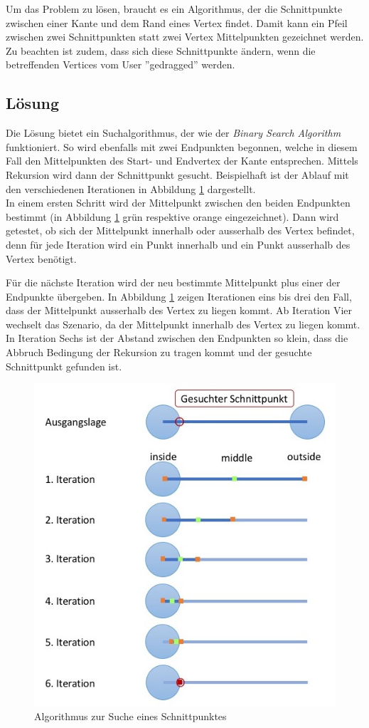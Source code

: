 \documentclass[11pt,a4paper,english,oneside]{book}
\numberwithin{equation}{chapter}
\begin{document}
	Um das Problem zu lösen, braucht es ein Algorithmus, der die Schnittpunkte zwischen einer Kante und dem Rand eines Vertex findet. Damit kann ein Pfeil zwischen zwei Schnittpunkten statt zwei Vertex Mittelpunkten gezeichnet werden. Zu beachten ist zudem, dass sich diese Schnittpunkte ändern, wenn die betreffenden Vertices vom User ''gedragged'' werden.
	
	\subsection{Lösung}
	Die Lösung bietet ein Suchalgorithmus, der wie der \textit{Binary Search Algorithm} \cite{adbook} funktioniert. So wird ebenfalls mit zwei Endpunkten begonnen, welche in diesem Fall den Mittelpunkten des Start- und Endvertex der Kante entsprechen. Mittels Rekursion wird dann der Schnittpunkt gesucht. Beispielhaft ist der Ablauf mit den verschiedenen Iterationen in Abbildung \ref{fig:binarySearch} dargestellt. \\
	In einem ersten Schritt wird der Mittelpunkt zwischen den beiden Endpunkten bestimmt (in Abbildung  \ref{fig:binarySearch} grün respektive orange eingezeichnet). Dann wird getestet, ob sich der Mittelpunkt innerhalb oder ausserhalb des Vertex befindet, denn für jede Iteration wird ein Punkt innerhalb und ein Punkt ausserhalb des Vertex benötigt.
	
	Für die nächste Iteration wird der neu bestimmte Mittelpunkt plus einer der Endpunkte übergeben. In Abbildung  \ref{fig:binarySearch} zeigen Iterationen eins bis drei den Fall, dass der Mittelpunkt ausserhalb des Vertex zu liegen kommt. Ab Iteration Vier wechselt das Szenario, da der Mittelpunkt innerhalb des Vertex zu liegen kommt. In Iteration Sechs ist der Abstand zwischen den Endpunkten so klein, dass die Abbruch Bedingung der Rekursion zu tragen kommt und der gesuchte Schnittpunkt gefunden ist.
	
	\begin{figure}[h!]
		\centering
		\includegraphics[width=0.6\linewidth]{assets/images/binarySearch}
		\caption{Algorithmus zur Suche eines Schnittpunktes}
		\label{fig:binarySearch}
	\end{figure}
	
\end{document}
